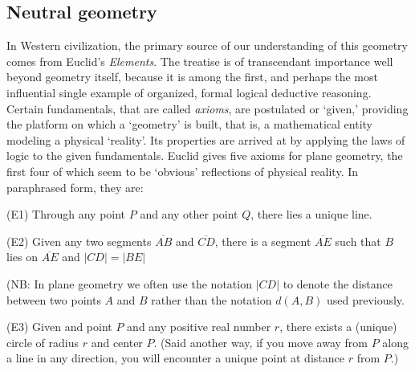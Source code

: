 
\subsection*{Neutral geometry}


In Western civilization, the primary source of our understanding of
this geometry comes from Euclid's \textit{Elements}. The treatise is
of transcendant importance well beyond geometry itself, because it is
among the first, and perhaps the most influential single example of
organized, formal logical deductive reasoning. Certain fundamentals,
that are called \textit{axioms}, are postulated or `given,' providing
the platform on which a `geometry' is built, that is, a mathematical
entity modeling a physical `reality'. Its properties are arrived at by
applying the laws of logic to the given fundamentals. Euclid gives
five axioms for plane geometry, the first four of which seem to be
`obvious' reflections of physical reality. In paraphrased form, they
are:

\begin{axiom}
(E1) Through any point $P$ and any other point $Q$, there lies a
unique line.
\end{axiom}

\begin{axiom}
(E2) Given any two segments $\overline{AB}$ and $\overline{CD}$, there
is a segment $\overline{AE}$ such that $B$ lies on $\overline{AE}$ and
$\left\vert CD\right\vert =\left\vert BE\right\vert $

(NB: In plane geometry we often use the notation $\left\vert
CD\right\vert $ to denote the distance between two points $A$ and $B$
rather than the notation $d\left( A,B\right) $ used previously.
\end{axiom}

\begin{axiom}
(E3) Given and point $P$ and any positive real number $r$, there
exists a (unique) circle of radius $r$ and center $P$. (Said another
way, if you move away from $P$ along a line in any direction, you will
encounter a unique point at distance $r$ from $P$.)
\end{axiom}

